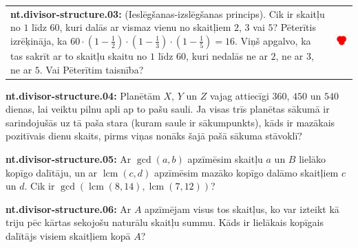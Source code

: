 \documentclass[11pt]{article}
\newenvironment{uzdevums}[1][\unskip]{%
\vspace{3mm}
\noindent
\textbf{#1:}
\noindent}
{}
\begin{document}
\begin{tabular}{@{}ll@{}} 
\begin{minipage}{0.7\columnwidth}
\begin{uzdevums}[nt.divisor-structure.03]
(Ieslēgšanas-izslēgšanas princips). Cik ir skaitļu no $1$ līdz $60$, kuri dalās 
ar vismaz vienu no skaitļiem $2$, $3$ vai $5$? 
Pēterītis izrēķināja, ka ${\displaystyle 60 \cdot \left( 1 - \frac{1}{2} \right)
 \cdot \left( 1 - \frac{1}{3} \right) \cdot \left( 1 - \frac{1}{5} \right) = 16}$. 
Viņš apgalvo, ka tas sakrīt ar to skaitļu skaitu no 
$1$ līdz $60$, kuri nedalās ne ar $2$, ne ar $3$, ne ar $5$. Vai Pēterītim taisnība?
\end{uzdevums}
\end{minipage} &
\begin{minipage}{0.25\columnwidth}
\begin{center}
\includegraphics[width=1.5in]{test08-3a.png}
\end{center}
\end{minipage}
\end{tabular}





\begin{uzdevums}[nt.divisor-structure.04]
Planētām $X$, $Y$ un $Z$ vajag attiecīgi $360$, $450$ un $540$ dienas, lai veiktu pilnu apli ap to pašu 
sauli. Ja visas trīs planētas sākumā ir sarindojušās uz tā paša stara (kuram saule ir sākumpunkts), 
kāds ir mazākais pozitīvais dienu skaits, pirms viņas nonāks šajā pašā sākuma stāvoklī? 
\end{uzdevums}


\begin{uzdevums}[nt.divisor-structure.05]
Ar $\gcd(a, b)$ apzīmēsim skaitļu $a$ un $B$ lielāko kopīgo dalītāju, un 
ar $\operatorname{lcm}(c,d)$ apzīmēsim mazāko kopīgo dalāmo skaitļiem $c$ un $d$. 
Cik ir $\gcd(\operatorname{lcm}(8,14),\operatorname{lcm}(7,12))$?
\end{uzdevums}

\begin{uzdevums}[nt.divisor-structure.06]
Ar $A$ apzīmējam visus tos skaitļus, ko var izteikt kā triju pēc kārtas sekojošu naturālu skaitļu summu. 
Kāds ir lielākais kopīgais dalītājs visiem skaitļiem kopā $A$? 
\end{uzdevums}
\end{document}
